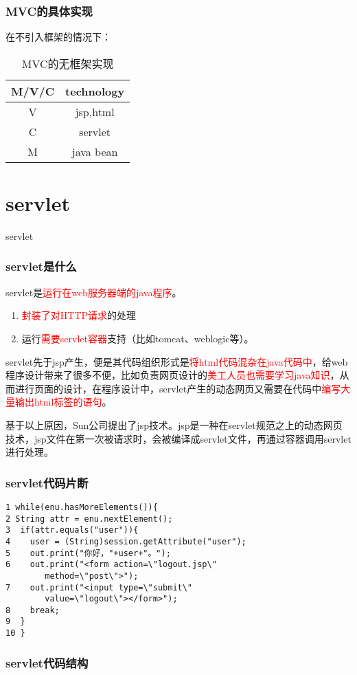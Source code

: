 \documentclass{beamer}
\begin{document}
\begin{frame}
\frametitle{MVC的具体实现}
在不引入框架的情况下：

\begin{table}
\begin{tabular}{cc}
\toprule
\textbf{M/V/C} & \textbf{technology}\\
\midrule
V & jsp,html\\
C & servlet\\
M & java bean\\
\bottomrule
\end{tabular}
\caption{MVC的无框架实现}

\end{table}
\end{frame}
\section{servlet}
\begin{frame}
\Huge{\centerline{servlet}}
\end{frame}
\begin{frame}
\frametitle{servlet是什么}
servlet是\textcolor{red}{运行在web服务器端的java程序}。
\begin{enumerate}
\item
\textcolor{red}{封装了对HTTP请求}的处理
\item
运行\textcolor{red}{需要servlet容器}支持（比如tomcat、weblogic等）。
\end{enumerate}


servlet先于jsp产生，便是其代码组织形式是\textcolor{red}{将html代码混杂在java代码中}，给web程序设计带来了很多不便，比如负责网页设计的\textcolor{red}{美工人员也需要学习java知识}，从而进行页面的设计，在程序设计中，servlet产生的动态网页又需要在代码中\textcolor{red}{编写大量输出html标签的语句}。

基于以上原因，Sun公司提出了jsp技术。jsp是一种在servlet规范之上的动态网页技术，jsp文件在第一次被请求时，会被编译成servlet文件，再通过容器调用servlet进行处理。

\end{frame}
\begin{frame}[fragile]
\frametitle{servlet代码片断}
\begin{lstlisting}
1 while(enu.hasMoreElements()){
2 String attr = enu.nextElement();
3  if(attr.equals("user")){
4    user = (String)session.getAttribute("user");
5    out.print("你好，"+user+"。");
6    out.print("<form action=\"logout.jsp\"
        method=\"post\">");
7    out.print("<input type=\"submit\" 
        value=\"logout\"></form>");
8    break;
9  }
10 }
\end{lstlisting}
\end{frame}
\begin{frame}
\frametitle{servlet代码结构}

\end{frame}
\end{document}
